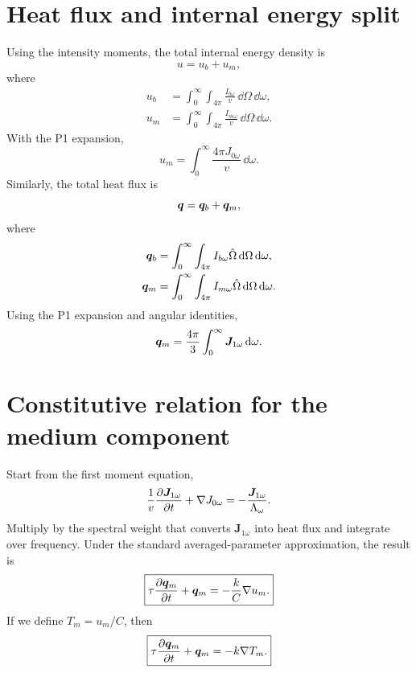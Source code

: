 \documentclass[11pt]{article}
\begin{document}
\section{Heat flux and internal energy split}
Using the intensity moments, the total internal energy density is
\begin{equation}
    u=u_b+u_m,
    \label{eq:u_split}
\end{equation}
where
\begin{align}
    u_b &=\int_0^\infty\int_{4\pi}\frac{I_{b\omega}}{v}\,\dd\Omega\,\dd\omega,\\
    u_m &=\int_0^\infty\int_{4\pi}\frac{I_{m\omega}}{v}\,\dd\Omega\,\dd\omega.
\end{align}
With the P1 expansion,
\begin{equation}
    u_m=\int_0^\infty \frac{4\pi J_{0\omega}}{v}\,\dd\omega.
\end{equation}
Similarly, the total heat flux is
\begin{equation}
    \bm{q}=\bm{q}_b+\bm{q}_m,
    \label{eq:q_split}
\end{equation}
where
\begin{align}
    \bm{q}_b &=\int_0^\infty\int_{4\pi} I_{b\omega}\hat{\Omega}\,\dd\Omega\,\dd\omega,\\
    \bm{q}_m &=\int_0^\infty\int_{4\pi} I_{m\omega}\hat{\Omega}\,\dd\Omega\,\dd\omega.
\end{align}
Using the P1 expansion and angular identities,
\begin{equation}
    \bm{q}_m=\frac{4\pi}{3}\int_0^\infty \bm{J}_{1\omega}\,\dd\omega.
    \label{eq:qm_j1}
\end{equation}

\section{Constitutive relation for the medium component}
Start from the first moment equation,
\begin{equation}
    \frac{1}{v}\frac{\partial \bm{J}_{1\omega}}{\partial t}+\nabla J_{0\omega}
    =-\frac{\bm{J}_{1\omega}}{\Lambda_\omega}.
\end{equation}
Multiply by the spectral weight that converts \(\bm{J}_{1\omega}\) into heat flux and integrate over frequency. Under the standard averaged-parameter approximation, the result is
\begin{equation}
    \boxed{\tau\frac{\partial \bm{q}_m}{\partial t}+\bm{q}_m
    =-\frac{k}{C}\nabla u_m.}
    \label{eq:qm_constitutive_um}
\end{equation}
If we define \(T_m=u_m/C\), then
\begin{equation}
    \boxed{\tau\frac{\partial \bm{q}_m}{\partial t}+\bm{q}_m=-k\nabla T_m.}
    \label{eq:qm_constitutive_Tm}
\end{equation}
\end{document}
